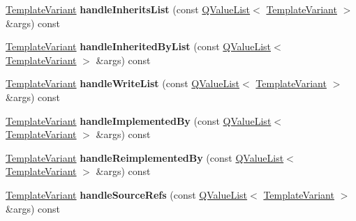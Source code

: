 \begin{DoxyCompactItemize}
\mbox{\hyperlink{class_template_variant}{Template\+Variant}} {\bfseries handle\+Inherits\+List} (const \mbox{\hyperlink{class_q_value_list}{Q\+Value\+List}}$<$ \mbox{\hyperlink{class_template_variant}{Template\+Variant}} $>$ \&args) const
\item 
\mbox{\label{class_translate_context_1_1_private_a8d52521e2f154a7bdb61f0ee64705025}} 
\mbox{\hyperlink{class_template_variant}{Template\+Variant}} {\bfseries handle\+Inherited\+By\+List} (const \mbox{\hyperlink{class_q_value_list}{Q\+Value\+List}}$<$ \mbox{\hyperlink{class_template_variant}{Template\+Variant}} $>$ \&args) const
\item 
\mbox{\label{class_translate_context_1_1_private_a74ced2e3263fee4bfa9e669dfa82af64}} 
\mbox{\hyperlink{class_template_variant}{Template\+Variant}} {\bfseries handle\+Write\+List} (const \mbox{\hyperlink{class_q_value_list}{Q\+Value\+List}}$<$ \mbox{\hyperlink{class_template_variant}{Template\+Variant}} $>$ \&args) const
\item 
\mbox{\label{class_translate_context_1_1_private_a58ad4baea8e11628003f335ace50ca60}} 
\mbox{\hyperlink{class_template_variant}{Template\+Variant}} {\bfseries handle\+Implemented\+By} (const \mbox{\hyperlink{class_q_value_list}{Q\+Value\+List}}$<$ \mbox{\hyperlink{class_template_variant}{Template\+Variant}} $>$ \&args) const
\item 
\mbox{\label{class_translate_context_1_1_private_a7fb1c69363ee0e9a58b891f32d5173a4}} 
\mbox{\hyperlink{class_template_variant}{Template\+Variant}} {\bfseries handle\+Reimplemented\+By} (const \mbox{\hyperlink{class_q_value_list}{Q\+Value\+List}}$<$ \mbox{\hyperlink{class_template_variant}{Template\+Variant}} $>$ \&args) const
\item 
\mbox{\label{class_translate_context_1_1_private_a5011842d2791966bc680c5795c9224d8}} 
\mbox{\hyperlink{class_template_variant}{Template\+Variant}} {\bfseries handle\+Source\+Refs} (const \mbox{\hyperlink{class_q_value_list}{Q\+Value\+List}}$<$ \mbox{\hyperlink{class_template_variant}{Template\+Variant}} $>$ \&args) const
\item 
\mbox{\label{class_translate_context_1_1_private_a96b9cfe034550d7280da8cb2266cb516}} 

\end{DoxyCompactItemize}
